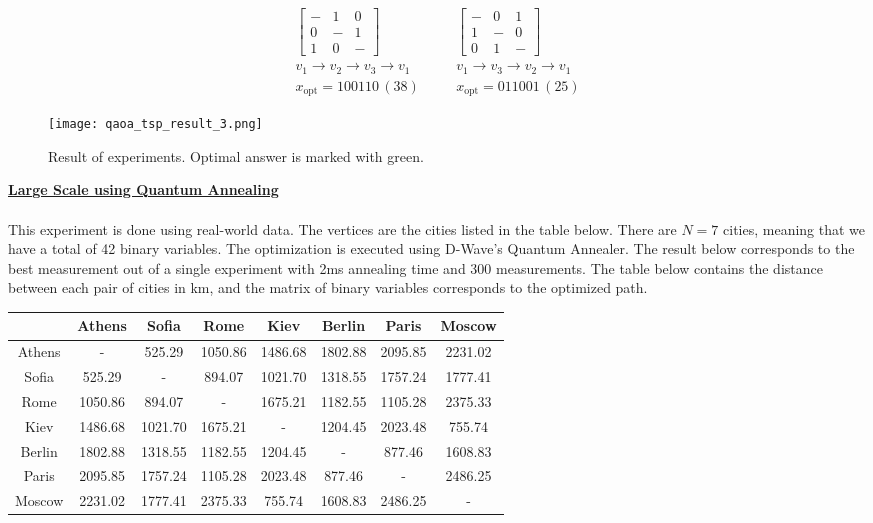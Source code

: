 \documentclass[12pt,a4paper]{report}
\begin{document}
\[
\begin{array}{ccc}
\left[
\begin{array}{ccc}
- & 1 & 0 \\
0 & - & 1 \\
1 & 0 & -
\end{array}
\right] 
& \quad &
\left[
\begin{array}{ccc}
- & 0 & 1 \\
1 & - & 0 \\
0 & 1 & -
\end{array}
\right] \\
v_1 \to v_2 \to v_3 \to v_1
& & 
v_1 \to v_3 \to v_2 \to v_1 \\
x_{\text{opt}} = 100110 \, (38)
& &
x_{\text{opt}} = 011001 \, (25)
\end{array}
\]
\begin{figure}[!h]
    \centering
    \texttt{[image: qaoa\_tsp\_result\_3.png]}
    \caption{Result of experiments. Optimal answer is marked with green.}
    \label{fig:tsp_experiments_qaoa}
\end{figure}

\newpage

\noindent
\textbf{\underline{Large Scale using Quantum Annealing}}
\\~\\
\noindent
This experiment is done using real-world data. The vertices are the cities listed in the table below. There are \( N = 7 \) cities, meaning that we have a total of 42 binary variables. The optimization is executed using D-Wave's Quantum Annealer. The result below corresponds to the best measurement out of a single experiment with 2ms annealing time and 300 measurements. The table below contains the distance between each pair of cities in km, and the matrix of binary variables corresponds to the optimized path.
\\


\begin{tabular}{|c|c|c|c|c|c|c|c|}
\hline
 & Athens & Sofia & Rome & Kiev & Berlin & Paris & Moscow \\
\hline
Athens & - & 525.29 & 1050.86 & 1486.68 & 1802.88 & 2095.85 & 2231.02 \\
\hline
Sofia & 525.29 & - & 894.07 & 1021.70 & 1318.55 & 1757.24 & 1777.41 \\
\hline
Rome & 1050.86 & 894.07 & - & 1675.21 & 1182.55 & 1105.28 & 2375.33 \\
\hline
Kiev & 1486.68 & 1021.70 & 1675.21 & - & 1204.45 & 2023.48 & 755.74 \\
\hline
Berlin & 1802.88 & 1318.55 & 1182.55 & 1204.45 & - & 877.46 & 1608.83 \\
\hline
Paris & 2095.85 & 1757.24 & 1105.28 & 2023.48 & 877.46 & - & 2486.25 \\
\hline
Moscow & 2231.02 & 1777.41 & 2375.33 & 755.74 & 1608.83 & 2486.25 & - \\
\hline
\end{tabular}
\\
\end{document}
